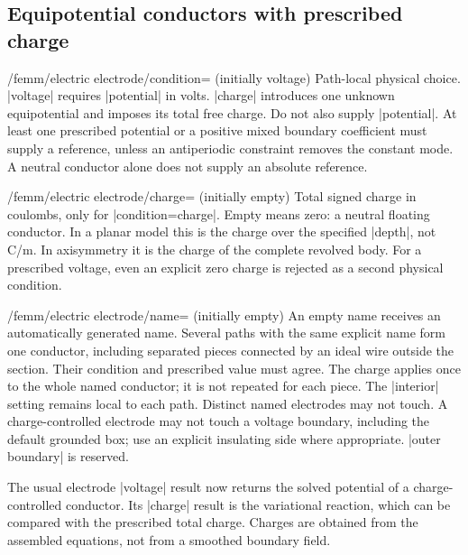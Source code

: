 \subsection{Equipotential conductors with prescribed charge}
\begin{key}{/femm/electric electrode/condition= (initially voltage)}
Path-local physical choice. |voltage| requires |potential| in volts.
|charge| introduces one unknown equipotential and imposes its total free
charge. Do not also supply |potential|. At least one prescribed potential or
a positive mixed boundary coefficient must supply a reference, unless an
antiperiodic constraint removes the constant mode. A neutral conductor alone
does not supply an absolute reference.
\end{key}
\begin{key}{/femm/electric electrode/charge= (initially empty)}
Total signed charge in coulombs, only for |condition=charge|. Empty means zero:
a neutral floating conductor. In a planar model this is the charge over the
specified |depth|, not C/m. In axisymmetry it is the charge of the complete
revolved body. For a prescribed voltage, even an explicit zero charge is
rejected as a second physical condition.
\end{key}
\begin{key}{/femm/electric electrode/name= (initially empty)}
An empty name receives an automatically generated name. Several paths with the
same explicit name form one conductor, including separated pieces connected
by an ideal wire outside the section. Their condition and prescribed value
must agree. The charge applies once to the whole named conductor; it is not
repeated for each piece. The |interior| setting remains local to each path.
Distinct named electrodes may not touch. A charge-controlled electrode may
not touch a voltage boundary, including the default grounded box; use an
explicit insulating side where appropriate. |outer boundary| is reserved.
\end{key}
The usual electrode |voltage| result now returns the solved potential of a
charge-controlled conductor. Its |charge| result is the variational reaction,
which can be compared with the prescribed total charge. Charges are obtained
from the assembled equations, not from a smoothed boundary field.

